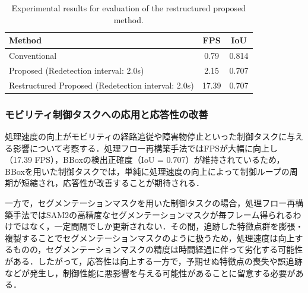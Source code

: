 \vspace{1cm}

\begin{table}[htbp]
\centering
\caption{Experimental results for evaluation of the restructured proposed method.}
\label{tab:results_improved}
\begin{tabular}{lcc}
\hline
Method & FPS & IoU \\
\hline
Conventional & 0.79 & 0.814 \\
Proposed (Redetection interval: 2.0s) & 2.15 & 0.707 \\
Restructured Proposed (Redetection interval: 2.0s) & 17.39 & 0.707 \\
\hline
\end{tabular}
\end{table}

\newpage

\subsubsection{モビリティ制御タスクへの応用と応答性の改善}
処理速度の向上がモビリティの経路追従や障害物停止といった制御タスクに与える影響について考察する．処理フロー再構築手法ではFPSが大幅に向上し（17.39 FPS），BBoxの検出正確度（IoU = 0.707）が維持されているため，BBoxを用いた制御タスクでは，単純に処理速度の向上によって制御ループの周期が短縮され，応答性が改善することが期待される．

一方で，セグメンテーションマスクを用いた制御タスクの場合，処理フロー再構築手法ではSAM2の高精度なセグメンテーションマスクが毎フレーム得られるわけではなく，一定間隔でしか更新されない．その間，追跡した特徴点群を膨張・複製することでセグメンテーションマスクのように扱うため，処理速度は向上するものの，セグメンテーションマスクの精度は時間経過に伴って劣化する可能性がある．したがって，応答性は向上する一方で，予期せぬ特徴点の喪失や誤追跡などが発生し，制御性能に悪影響を与える可能性があることに留意する必要がある．

\newpage